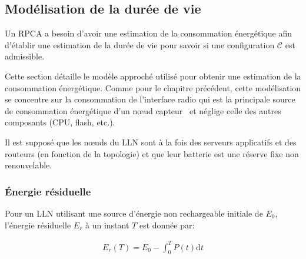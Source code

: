 


\subsection{Modélisation de la durée de vie}

Un \ac{RPCA} a besoin d'avoir une estimation de la consommation énergétique afin d'établir une estimation de la durée de vie pour savoir si une configuration $\mathcal{C}$ est admissible.

Cette section détaille le modèle approché utilisé pour obtenir une estimation de la consommation énergétique.
Comme pour le chapitre précédent, cette modélisation se concentre sur la consommation de l'interface radio qui est la principale source de consommation énergétique d'un nœud capteur~\cite{molina2010energy} et néglige celle des autres composants (\ac{CPU}, flash, etc.).

Il est supposé que les nœuds du \ac{LLN} sont à la fois des serveurs applicatifs et des routeurs (en fonction de la topologie) et que leur batterie est une réserve fixe non renouvelable.

\subsubsection{Énergie résiduelle}

Pour un \ac{LLN} utilisant une source d'énergie non rechargeable initiale de $E_0$, l'énergie résiduelle $E_r$ à un instant $T$ est donnée par:

\begin{align}
  E_r(T) = E_0 - \int_0^T P(t) \mathrm{d}t
  \label{contikimac:eq:residual_energy}
\end{align}


